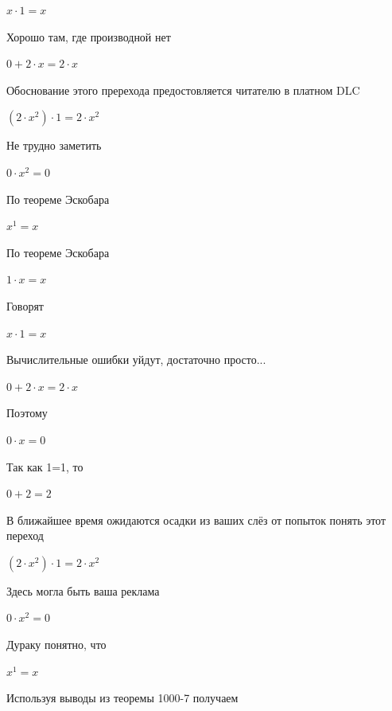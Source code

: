 \documentclass[12pt,a4paper,fleqn]{article}
\begin{document}
\begin{center}
$x \cdot 1 = x$\end{center}
Хорошо там, где производной нет\cite{link2}

\begin{center}
$0+2 \cdot x = 2 \cdot x$\end{center}
Обоснование этого пререхода предостовляется читателю в платном DLC

\begin{center}
$(2 \cdot x^{2}) \cdot 1 = 2 \cdot x^{2}$\end{center}
Не трудно заметить

\begin{center}
$0 \cdot x^{2} = 0$\end{center}
По теореме Эскобара

\begin{center}
$x^{1} = x$\end{center}
По теореме Эскобара

\begin{center}
$1 \cdot x = x$\end{center}
Говорят

\begin{center}
$x \cdot 1 = x$\end{center}
Вычислительные ошибки уйдут, достаточно просто...

\begin{center}
$0+2 \cdot x = 2 \cdot x$\end{center}
Поэтому

\begin{center}
$0 \cdot x = 0$\end{center}
Так как 1=1, то\cite{link4}

\begin{center}
$0+2 = 2$\end{center}
В ближайшее время ожидаются осадки из ваших слёз от попыток понять этот переход

\begin{center}
$(2 \cdot x^{2}) \cdot 1 = 2 \cdot x^{2}$\end{center}
Здесь могла быть ваша реклама

\begin{center}
$0 \cdot x^{2} = 0$\end{center}
Дураку понятно, что

\begin{center}
$x^{1} = x$\end{center}
Используя выводы из теоремы 1000-7 получаем
\end{document}
